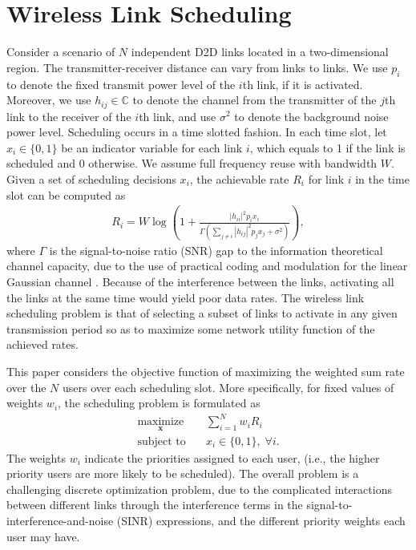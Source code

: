 \documentclass[journal,12pt,onecolumn,draftclsnofoot,]{IEEEtran}
\begin{document}
\section{Wireless Link Scheduling}

Consider a scenario of $N$ independent D2D links located in a two-dimensional
region. The transmitter-receiver distance can vary from
links to links. We use $p_i$ to denote the fixed transmit power level of the
$i$th link, if it is activated. Moreover, we use $h_{ij}\in\mathbb C$ to denote
the channel from the transmitter of the $j$th link to the receiver of the $i$th
link, and use $\sigma^2$ to denote the background noise power level. Scheduling
occurs in a time slotted fashion. In each time slot, let
$x_i\in\{0,1\}$ be an indicator variable for each link $i$, which equals to 1
if the link is scheduled and 0 otherwise. We assume full frequency reuse with
bandwidth $W$. Given a set of scheduling decisions $x_i$, the achievable rate
$R_i$ for link $i$ in the time slot can be computed as
\begin{align} \label{equ:instantRate}
R_i =W\log\left(1+\frac{|h_{ii}|^2p_ix_i}{\Gamma(\sum_{j\neq i}|h_{ij}|^2 p_jx_j + \sigma^2)}\right),
\end{align}
where $\Gamma$ is the signal-to-noise ratio (SNR) gap to the information theoretical channel capacity, due to the use of practical coding and modulation for the linear Gaussian channel \cite{forney}.
Because of the interference between the links, activating all the links at the
same time would yield poor data rates. The wireless link scheduling problem is
that of selecting a subset of links to activate in any given transmission period
so as to maximize some network utility function of the achieved rates.

This paper considers the objective function of maximizing the weighted sum rate
over the $N$ users over each scheduling slot. More specifically, for fixed
values of weights $w_i$, the scheduling problem is formulated as
\begin{subequations}
\label{prob}
\begin{align}
\underset{\mathbf{x}}{\text{maximize}}\quad&
\sum^N_{i=1} w_i R_i\\
\text{subject to}\quad& x_i \in \{0,1\},\;\forall i.
\end{align}
\end{subequations}
The weights $w_i$ indicate the priorities assigned to each user, (i.e., the higher
priority users are more likely to be scheduled). The overall problem is
a challenging discrete optimization problem, due to the complicated
interactions between different links through the interference terms in the
signal-to-interference-and-noise (SINR) expressions, and the different
priority weights each user may have.
\end{document}
